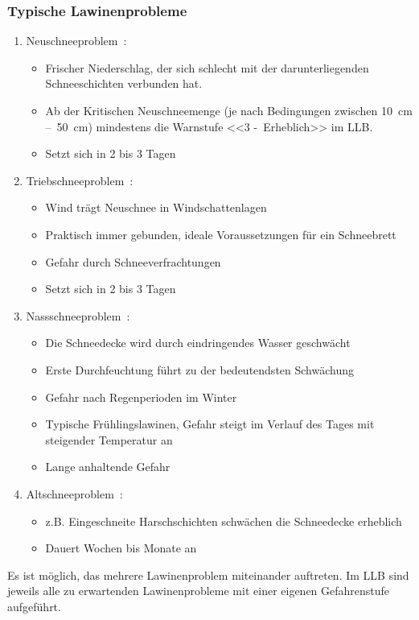 \pagebreak
\subsubsection{Typische Lawinenprobleme}\label{lawinenprobleme}

\begin{enumerate}
  \item Neuschneeproblem~\cite{achtunglawine}:
  \begin{itemize}
    \item Frischer Niederschlag, der sich schlecht mit der darunterliegenden Schneeschichten verbunden hat. 
    \item Ab der Kritischen Neuschneemenge (je nach Bedingungen zwischen \qty{10}{cm} --~\qty{50}{cm}) mindestens die Warnstufe <<3 -~Erheblich>> im LLB.\@
    \item Setzt sich in 2 bis 3 Tagen
  \end{itemize}
  \item Triebschneeproblem~\cite{achtunglawine}:
  \begin{itemize}
    \item Wind trägt Neuschnee in Windschattenlagen
    \item Praktisch immer gebunden, ideale Voraussetzungen für ein Schneebrett
    \item Gefahr durch Schneeverfrachtungen
    \item Setzt sich in 2 bis 3 Tagen
  \end{itemize}
  \item Nassschneeproblem~\cite{achtunglawine}:
  \begin{itemize}
    \item Die Schneedecke wird durch eindringendes Wasser geschwächt
    \item Erste Durchfeuchtung führt zu der bedeutendsten Schwächung
    \item Gefahr nach Regenperioden im Winter
    \item Typische Frühlingslawinen, Gefahr steigt im Verlauf des Tages mit steigender Temperatur an
    \item Lange anhaltende Gefahr
  \end{itemize}
  \item Altschneeproblem~\cite{achtunglawine}:
  \begin{itemize}
    \item z.B. Eingeschneite Harschschichten schwächen die Schneedecke erheblich
    \item Dauert Wochen bis Monate an
  \end{itemize}
\end{enumerate}
Es ist möglich, das mehrere Lawinenproblem miteinander auftreten. Im LLB sind jeweils alle zu erwartenden Lawinenprobleme mit einer eigenen Gefahrenstufe aufgeführt.~\cite{slfTypischeLawinenprobleme}

